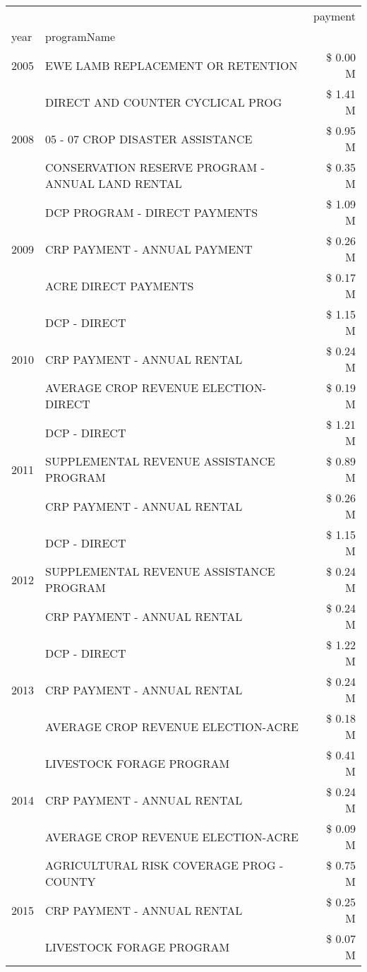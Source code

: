 \begin{tabular}{llr}
\toprule
 &  & payment \\
year & programName &  \\
\midrule
2005 & EWE LAMB REPLACEMENT OR RETENTION & \$ 0.00 M \\
\cline{1-3}
\multirow[t]{3}{*}{2008} & DIRECT AND COUNTER CYCLICAL PROG & \$ 1.41 M \\
 & 05 - 07 CROP DISASTER ASSISTANCE & \$ 0.95 M \\
 & CONSERVATION RESERVE PROGRAM - ANNUAL LAND RENTAL & \$ 0.35 M \\
\cline{1-3}
\multirow[t]{3}{*}{2009} & DCP PROGRAM - DIRECT PAYMENTS & \$ 1.09 M \\
 & CRP PAYMENT - ANNUAL PAYMENT & \$ 0.26 M \\
 & ACRE DIRECT PAYMENTS & \$ 0.17 M \\
\cline{1-3}
\multirow[t]{3}{*}{2010} & DCP - DIRECT & \$ 1.15 M \\
 & CRP PAYMENT - ANNUAL RENTAL & \$ 0.24 M \\
 & AVERAGE CROP REVENUE ELECTION-DIRECT & \$ 0.19 M \\
\cline{1-3}
\multirow[t]{3}{*}{2011} & DCP - DIRECT & \$ 1.21 M \\
 & SUPPLEMENTAL REVENUE ASSISTANCE PROGRAM & \$ 0.89 M \\
 & CRP PAYMENT - ANNUAL RENTAL & \$ 0.26 M \\
\cline{1-3}
\multirow[t]{3}{*}{2012} & DCP - DIRECT & \$ 1.15 M \\
 & SUPPLEMENTAL REVENUE ASSISTANCE PROGRAM & \$ 0.24 M \\
 & CRP PAYMENT - ANNUAL RENTAL & \$ 0.24 M \\
\cline{1-3}
\multirow[t]{3}{*}{2013} & DCP - DIRECT & \$ 1.22 M \\
 & CRP PAYMENT - ANNUAL RENTAL & \$ 0.24 M \\
 & AVERAGE CROP REVENUE ELECTION-ACRE & \$ 0.18 M \\
\cline{1-3}
\multirow[t]{3}{*}{2014} & LIVESTOCK FORAGE PROGRAM & \$ 0.41 M \\
 & CRP PAYMENT - ANNUAL RENTAL & \$ 0.24 M \\
 & AVERAGE CROP REVENUE ELECTION-ACRE & \$ 0.09 M \\
\cline{1-3}
\multirow[t]{3}{*}{2015} & AGRICULTURAL RISK COVERAGE PROG - COUNTY & \$ 0.75 M \\
 & CRP PAYMENT - ANNUAL RENTAL & \$ 0.25 M \\
 & LIVESTOCK FORAGE PROGRAM & \$ 0.07 M \\

\end{tabular}
